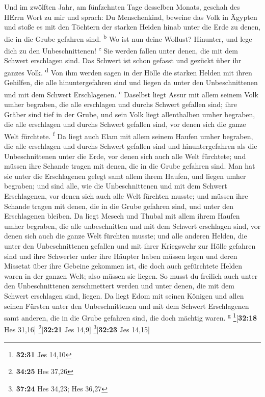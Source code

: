  Und im zwölften Jahr, am fünfzehnten Tage desselben
Monats, geschah des HErrn Wort zu mir und sprach:  Du
Menschenkind, beweine das Volk in Ägypten und stoße es mit den Töchtern
der starken Heiden hinab unter die Erde zu denen, die in die Grube
gefahren sind. \textsuperscript{b}  Wo ist nun deine
Wollust? Hinunter, und lege dich zu den Unbeschnittenen!
\textsuperscript{c}  Sie werden fallen unter denen, die
mit dem Schwert erschlagen sind. Das Schwert ist schon gefasst und
gezückt über ihr ganzes Volk. \textsuperscript{d}  Von
ihm werden sagen in der Hölle die starken Helden mit ihren Gehilfen, die
alle hinuntergefahren sind und liegen da unter den Unbeschnittenen und
mit dem Schwert Erschlagenen. \textsuperscript{e} 
Daselbst liegt Assur mit allem seinem Volk umher begraben, die alle
erschlagen und durchs Schwert gefallen sind;  ihre Gräber
sind tief in der Grube, und sein Volk liegt allenthalben umher begraben,
die alle erschlagen und durchs Schwert gefallen sind, vor denen sich die
ganze Welt fürchtete. \textsuperscript{f}  Da liegt auch
Elam mit allem seinem Haufen umher begraben, die alle erschlagen und
durchs Schwert gefallen sind und hinuntergefahren als die
Unbeschnittenen unter die Erde, vor denen sich auch alle Welt fürchtete;
und müssen ihre Schande tragen mit denen, die in die Grube gefahren
sind.  Man hat sie unter die Erschlagenen gelegt samt
allem ihrem Haufen, und liegen umher begraben; und sind alle, wie die
Unbeschnittenen und mit dem Schwert Erschlagenen, vor denen sich auch
alle Welt fürchten musste; und müssen ihre Schande tragen mit denen, die
in die Grube gefahren sind, und unter den Erschlagenen bleiben.
 Da liegt Mesech und Thubal mit allem ihrem Haufen umher
begraben, die alle unbeschnitten und mit dem Schwert erschlagen sind,
vor denen sich auch die ganze Welt fürchten musste;  und
alle anderen Helden, die unter den Unbeschnittenen gefallen und mit
ihrer Kriegswehr zur Hölle gefahren sind und ihre Schwerter unter ihre
Häupter haben müssen legen und deren Missetat über ihre Gebeine gekommen
ist, die doch auch gefürchtete Helden waren in der ganzen Welt; also
müssen sie liegen.  So musst du freilich auch unter den
Unbeschnittenen zerschmettert werden und unter denen, die mit dem
Schwert erschlagen sind, liegen.  Da liegt Edom mit
seinen Königen und allen seinen Fürsten unter den Unbeschnittenen und
mit dem Schwert Erschlagenen samt anderen, die in die Grube gefahren
sind, die doch mächtig waren. \textsuperscript{g}
\footnote{\textbf{32:31} Jes 14,10}{[}\textbf{32:18} Hes 31,16{]}
\footnote{\textbf{34:25} Hes 37,26}{[}\textbf{32:21} Jes 14,9{]}
\footnote{\textbf{37:24} Hes 34,23; Hes 36,27}{[}\textbf{32:23} Jes
14,15{]}

